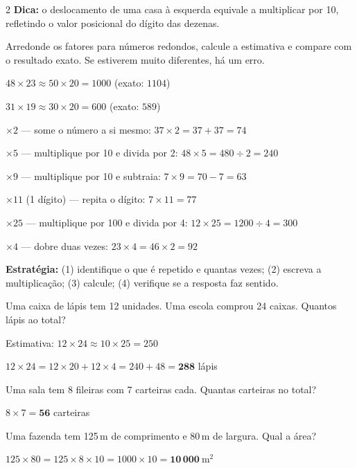 \documentclass[12pt,twoside]{article}
\begin{document}
\begin{multicols}{2}
\vspace{4pt}
\textbf{Dica:} o deslocamento de uma casa à esquerda equivale a multiplicar por 10, refletindo o valor posicional do dígito das dezenas.


Arredonde os fatores para números redondos, calcule a estimativa e compare com o resultado exato. Se estiverem muito diferentes, há um erro.


$48 \times 23 \approx 50 \times 20 = 1000$ \quad (exato: $1104$) \checkmark

$31 \times 19 \approx 30 \times 20 = 600$ \quad (exato: $589$) \checkmark


\textbf{$\times 2$} — some o número a si mesmo: $37 \times 2 = 37 + 37 = 74$

\textbf{$\times 5$} — multiplique por 10 e divida por 2: $48 \times 5 = 480 \div 2 = 240$

\textbf{$\times 9$} — multiplique por 10 e subtraia: $7 \times 9 = 70 - 7 = 63$

\textbf{$\times 11$} (1 dígito) — repita o dígito: $7 \times 11 = 77$

\textbf{$\times 25$} — multiplique por 100 e divida por 4: $12 \times 25 = 1200 \div 4 = 300$

\textbf{$\times 4$} — dobre duas vezes: $23 \times 4 = 46 \times 2 = 92$


\textbf{Estratégia:} (1) identifique o que é repetido e quantas vezes; (2) escreva a multiplicação; (3) calcule; (4) verifique se a resposta faz sentido.


Uma caixa de lápis tem 12 unidades. Uma escola comprou 24 caixas. Quantos lápis ao total?

Estimativa: $12 \times 24 \approx 10 \times 25 = 250$

$12 \times 24 = 12 \times 20 + 12 \times 4 = 240 + 48 = \mathbf{288}$ lápis \checkmark


Uma sala tem 8 fileiras com 7 carteiras cada. Quantas carteiras no total?

$8 \times 7 = \mathbf{56}$ carteiras \checkmark


Uma fazenda tem 125\,m de comprimento e 80\,m de largura. Qual a área?

$125 \times 80 = 125 \times 8 \times 10 = 1000 \times 10 = \mathbf{10\,000}\ \text{m}^2$ \checkmark

\end{multicols}
\end{document}
